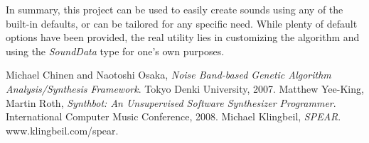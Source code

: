 \documentclass[11pt]{article}
\begin{document}
In summary, this project can be used to easily create sounds using any of the built-in defaults, or can be tailored for any specific need. While plenty of default options have been provided, the real utility lies in customizing the algorithm and using the \emph{SoundData} type for one's own purposes. 

\begin{thebibliography}{2}

	  Michael Chinen and Naotoshi Osaka,
	  \emph{Noise Band-based Genetic Algorithm Analysis/Synthesis Framework}.
	  Tokyo Denki University,
	  2007.
	  Matthew Yee-King, Martin Roth,
	  \emph{Synthbot: An Unsupervised Software Synthesizer Programmer}.
	  International Computer Music Conference,
	  2008.
	  Michael Klingbeil,
	  \emph{SPEAR}.
	  www.klingbeil.com/spear.
\end{thebibliography}
\end{document}
